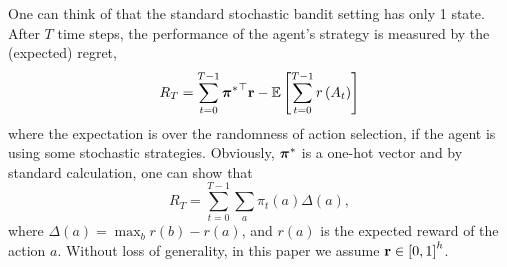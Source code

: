 One can think of that the standard stochastic bandit setting has only 1 state.  
After $T$ time steps, the performance of the agent's strategy is measured by the (expected) regret,
\begin{equation}
\label{eq:expected_regret}
R_T = \sum\limits_{t=0}^{T-1}{{{\boldsymbol{\pi}}^*}^\top {\mathbf{r}}} - {\mathbb{E}} \left[ \sum\limits_{t=0}^{T-1}{  r\left(A_t\right)  } \right] 
\end{equation}
where the expectation is over the randomness of action selection, if the agent is using some stochastic strategies.
Obviously, ${\boldsymbol{\pi}}^*$ is a one-hot vector and by standard calculation, one can show that
\[
R_T = \sum_{t=0}^{T-1} \sum_a \pi_t(a) \Delta(a),
\]
where $\Delta(a) = \max_b r(b)- r(a)$, and  $r(a)$ is the expected reward of the action $a$.
Without loss of generality, in this paper we assume ${\mathbf{r}} \in \left[ 0, 1 \right]^h$.



